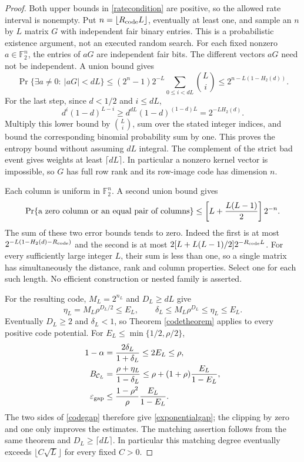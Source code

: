 \documentclass[11pt]{article}
\newcommand{\F}{\mathbb F}
\begin{document}
\begin{proof}
Both upper bounds in \eqref{ratecondition} are positive, so the allowed rate interval is nonempty. Put $n=\lfloor R_{\rm code}L\rfloor$, eventually at least one, and sample an $n$ by $L$ matrix $G$ with independent fair binary entries. This is a probabilistic existence argument, not an executed random search. For each fixed nonzero $a\in\F_2^n$, the entries of $aG$ are independent fair bits. The different vectors $aG$ need not be independent. A union bound gives
\[
 \Pr\{\exists a\ne0:\ |aG|<dL\}
 \leq(2^n-1)2^{-L}\sum_{0\leq i<dL}\binom Li
 \leq2^{n-L(1-H_2(d))}.
\]
For the last step, since $d<1/2$ and $i\leq dL$,
\[
 d^i(1-d)^{L-i}\geq d^{dL}(1-d)^{(1-d)L}=2^{-LH_2(d)}.
\]
Multiply this lower bound by $\binom Li$, sum over the stated integer indices, and bound the corresponding binomial probability sum by one. This proves the entropy bound without assuming $dL$ integral. The complement of the strict bad event gives weights at least $\lceil dL\rceil$. In particular a nonzero kernel vector is impossible, so $G$ has full row rank and its row-image code has dimension $n$.

Each column is uniform in $\F_2^n$. A second union bound gives
\[
 \Pr\{\hbox{a zero column or an equal pair of columns}\}
 \leq \left[L+\frac{L(L-1)}2\right]2^{-n}.
\]
The sum of these two error bounds tends to zero. Indeed the first is at most
$2^{-L(1-H_2(d)-R_{\rm code})}$ and the second is at most
$2[L+L(L-1)/2]2^{-R_{\rm code}L}$. For every sufficiently large integer $L$, their sum is less than one, so a single matrix has simultaneously the distance, rank and column properties. Select one for each such length. No efficient construction or nested family is asserted.

For the resulting code, $M_L=2^{n_L}$ and $D_L\geq dL$ give
\[
 \eta_L=M_L\rho^{D_L/2}\leq E_L,
 \qquad \delta_L\leq M_L\rho^{D_L}\leq\eta_L\leq E_L.
\]
Eventually $D_L\geq2$ and $\delta_L<1$, so Theorem \ref{codetheorem} applies to every positive code potential. For $E_L\leq\min\{1/2,\rho/2\}$,
\begin{align*}
 1-\alpha&=\frac{2\delta_L}{1+\delta_L}\leq2E_L\leq\rho,\\
 B_{\mathcal C_L}&=\frac{\rho+\eta_L}{1-\delta_L}
 \leq\rho+(1+\rho)\frac{E_L}{1-E_L},\\
 \varepsilon_{\rm gap}&\leq\frac{1-\rho^2}{\rho}\frac{E_L}{1-E_L}.
\end{align*}
The two sides of \eqref{codegap} therefore give \eqref{exponentialgap}; the clipping by zero and one only improves the estimates. The matching assertion follows from the same theorem and $D_L\geq\lceil dL\rceil$. In particular this matching degree eventually exceeds $\lfloor C\sqrt L\rfloor$ for every fixed $C>0$.


\end{proof}
\end{document}
